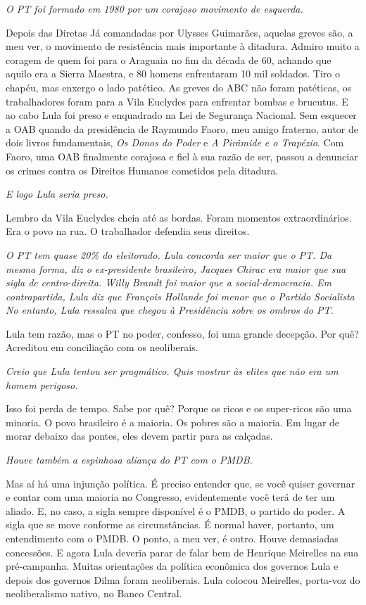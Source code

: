 \itshape
O PT foi formado em 1980 por um corajoso movimento de
esquerda.

\normalfont 
Depois das Diretas Já comandadas por Ulysses Guimarães,
aquelas greves são, a meu ver, o movimento de resistência mais
importante à ditadura. Admiro muito a coragem de quem foi para o
Araguaia no fim da década de 60, achando que aquilo era a Sierra
Maestra, e 80 homens enfrentaram 10 mil soldados. Tiro o chapéu, mas
enxergo o lado patético. As greves do ABC não foram patéticas, os
trabalhadores foram para a Vila Euclydes para enfrentar bombas e
brucutus. E ao cabo Lula foi preso e enquadrado na Lei de Segurança
Nacional. Sem esquecer a OAB quando da presidência de Raymundo Faoro,
meu amigo fraterno, autor de dois livros fundamentais, \emph{Os Donos}
\emph{do Poder} e \emph{A Pirâmide e o Trapézio}. Com Faoro, uma OAB
finalmente corajosa e fiel à sua razão de ser, passou a denunciar os
crimes contra os Direitos Humanos cometidos pela ditadura.

\itshape
E logo Lula seria preso.

\normalfont 
Lembro da Vila Euclydes cheia até as bordas. Foram
momentos extraordinários. Era o povo na rua. O trabalhador defendia seus
direitos.

\itshape
O PT tem quase 20\% do eleitorado. Lula concorda ser
maior que o PT. Da mesma forma, diz o ex-presidente brasileiro, Jacques
Chirac era maior que sua sigla de centro-direita. Willy Brandt foi maior
que a social-democracia. Em contrapartida, Lula diz que François
Hollande foi menor que o Partido Socialista No entanto, Lula ressalva
que chegou à Presidência sobre os ombros do PT.

\normalfont 
Lula tem razão, mas o PT no poder, confesso, foi uma
grande decepção. Por quê? Acreditou em conciliação com os neoliberais.

\itshape
Creio que Lula tentou ser pragmático. Quis mostrar às
elites que não era um homem perigoso.

\normalfont 
Isso foi perda de tempo. Sabe por quê? Porque os ricos e
os super-ricos são uma minoria. O povo brasileiro é a maioria. Os pobres
são a maioria. Em lugar de morar debaixo das pontes, eles devem partir
para as calçadas.

\itshape
Houve também a espinhosa aliança do PT com o PMDB.

\normalfont 
Mas aí há uma injunção política. É preciso entender que,
se você quiser governar e contar com uma maioria no Congresso,
evidentemente você terá de ter um aliado. E, no caso, a sigla sempre
disponível é o PMDB, o partido do poder. A sigla que se move conforme as
circunstâncias. É normal haver, portanto, um entendimento com o PMDB. O
ponto, a meu ver, é outro. Houve demasiadas concessões. E agora Lula
deveria parar de falar bem de Henrique Meirelles na sua pré-campanha.
Muitas orientações da política econômica dos governos Lula e depois dos
governos Dilma foram neoliberais. Lula colocou Meirelles, porta-voz do
neoliberalismo nativo, no Banco Central.

